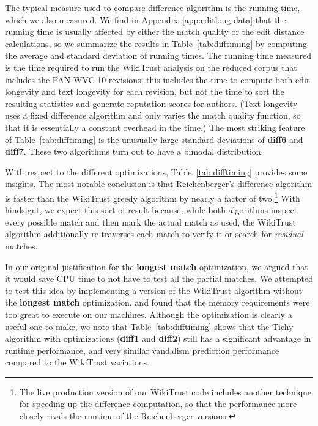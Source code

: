 

The typical measure used to compare difference algorithm is the
running time, which we also measured.
We find in Appendix~\ref{app:editlong-data} that the running time
is usually affected by either the
match quality or the edit distance calculations, so we
summarize the results in Table~\ref{tab:difftiming} by
computing the average and standard deviation of running times.
The running time measured is the time required to run the
WikiTrust analysis on the reduced corpus that includes
the PAN-WVC-10 revisions; this includes the time to compute
both edit longevity and text longevity for each revision,
but not the time to sort the resulting statistics and generate
reputation scores for authors.
(Text longevity uses a fixed difference algorithm and only varies
the match quality function, so that it is essentially a constant
overhead in the time.)
The most striking feature of Table~\ref{tab:difftiming} is the unusually
large standard deviations of \textbf{diff6} and \textbf{diff7}.
These two algorithms turn out to have a bimodal distribution.

With respect to the different optimizations, Table~\ref{tab:difftiming}
provides some insights.
The most notable conclusion is that Reichenberger's
difference algorithm is faster than the WikiTrust
greedy algorithm by nearly a factor of two.\footnote{The live
production version of our WikiTrust code includes another technique
for speeding up the difference computation, so that the performance
more closely rivals the runtime of the Reichenberger versions.}
With hindsignt, we expect this sort of result because, while both algorithms
inspect every possible match and then mark the actual
match as used, the WikiTrust algorithm additionally
re-traverses each match to verify it or search for
\textit{residual} matches.

In our original justification for the \textbf{longest match}
optimization, we argued that it would save CPU time to not have to test
all the partial matches.
We attempted to test this idea by implementing a version of the
WikiTrust algorithm without the \textbf{longest match} optimization, and
found that the memory requirements were too great to execute on our machines.
Although the optimization is clearly a useful one to make, we note that
Table~\ref{tab:difftiming} shows that the Tichy algorithm with
optimizations (\textbf{diff1} and \textbf{diff2})
still has a significant advantage in runtime performance,
and very similar vandalism prediction performance compared to the
WikiTrust variations.


